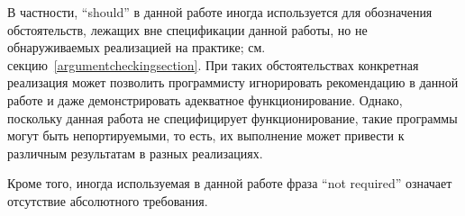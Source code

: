 В частности, ``should'' в данной работе иногда используется для обозначения обстоятельств,
лежащих вне спецификации данной работы, но не обнаруживаемых реализацией на практике;
см. секцию~\ref{argumentcheckingsection}. При таких обстоятельствах конкретная реализация может
позволить программисту игнорировать рекомендацию в данной работе и даже демонстрировать
адекватное функционирование. Однако, поскольку данная работа не специфицирует функционирование,
такие программы могут быть непортируемыми, то есть, их выполнение может привести к различным
результатам в разных реализациях.


Кроме того, иногда используемая в данной работе фраза ``not required'' означает отсутствие
абсолютного требования.

